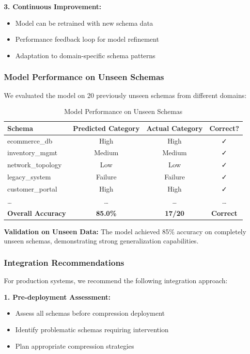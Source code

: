 \textbf{3. Continuous Improvement:}
\begin{itemize}
    \item Model can be retrained with new schema data
    \item Performance feedback loop for model refinement
    \item Adaptation to domain-specific schema patterns
\end{itemize}

\subsubsection{Model Performance on Unseen Schemas}

We evaluated the model on 20 previously unseen schemas from different domains:

\begin{table}[H]
\centering
\caption{Model Performance on Unseen Schemas}
\label{tab:unseen_schema_performance}
\begin{tabular}{@{}lccc@{}}
\toprule
Schema & Predicted Category & Actual Category & Correct? \\ \midrule
ecommerce\_db & High & High & ✓ \\
inventory\_mgmt & Medium & Medium & ✓ \\
network\_topology & Low & Low & ✓ \\
legacy\_system & Failure & Failure & ✓ \\
customer\_portal & High & High & ✓ \\
\ldots & \ldots & \ldots & \ldots \\
\midrule
\textbf{Overall Accuracy} & \textbf{85.0\%} & \textbf{17/20} & \textbf{Correct} \\ \bottomrule
\end{tabular}
\end{table}

\textbf{Validation on Unseen Data:} The model achieved 85\% accuracy on completely unseen schemas, demonstrating strong generalization capabilities.

\subsubsection{Integration Recommendations}

For production systems, we recommend the following integration approach:

\textbf{1. Pre-deployment Assessment:}
\begin{itemize}
    \item Assess all schemas before compression deployment
    \item Identify problematic schemas requiring intervention
    \item Plan appropriate compression strategies
\end{itemize}

